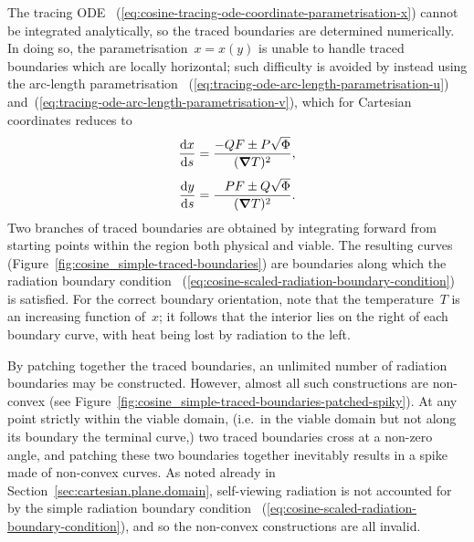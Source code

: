 The tracing ODE~%
  (\ref{eq:cosine-tracing-ode-coordinate-parametrisation-x})
cannot be integrated analytically,
so the traced boundaries are determined numerically.
In doing so, the parametrisation~$x = x (y)$
is unable to handle traced boundaries which are locally horizontal;
such difficulty is avoided by instead using the arc-length parametrisation~%
  (\ref{eq:tracing-ode-arc-length-parametrisation-u})
and~(\ref{eq:tracing-ode-arc-length-parametrisation-v}),
which for Cartesian coordinates reduces to
\begin{align}
  \tder{x}{s} &= \frac{-Q F \pm P \sqrt{\Phi}}{(\del T)^2},
    \label{eq:cosine-tracing-ode-arc-length-parametrisation-x} \\[\tallspace]
  \tder{y}{s} &= \frac{\+P F \pm Q \sqrt{\Phi}}{(\del T)^2}.
    \label{eq:cosine-tracing-ode-arc-length-parametrisation-y}
\end{align}
Two branches of traced boundaries are obtained
by integrating forward
from starting points within the region both physical and viable.
The resulting curves (Figure~\ref{fig:cosine_simple-traced-boundaries})
are boundaries along which the radiation boundary condition~%
  (\ref{eq:cosine-scaled-radiation-boundary-condition})
is satisfied.
For the correct boundary orientation,
note that the temperature~$T$ is an increasing function of~$x$;
it follows that the interior lies on the right of each boundary curve,
with heat being lost by radiation to the left.

\begin{figure}
\end{figure}

By patching together the traced boundaries,
an unlimited number of radiation boundaries may be constructed.
However, almost all such constructions are non-convex
(see Figure~\ref{fig:cosine_simple-traced-boundaries-patched-spiky}).
At any point strictly within the viable domain,
(i.e.~in the viable domain but not along its boundary the terminal curve,)
two traced boundaries cross at a non-zero angle,
and patching these two boundaries together
inevitably results in a spike made of non-convex curves.
As noted already in Section~\ref{sec:cartesian.plane.domain},
self-viewing radiation is not accounted for
by the simple radiation boundary condition~%
  (\ref{eq:cosine-scaled-radiation-boundary-condition}),
and so the non-convex constructions are all invalid.

